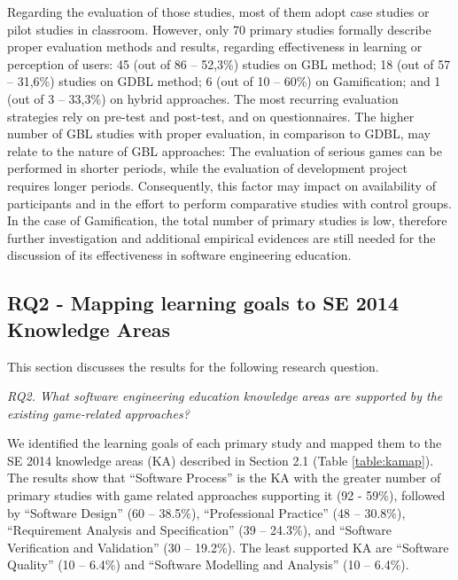 Regarding the evaluation of those studies, most of them adopt case studies or pilot studies in classroom. However, only 70 primary studies formally describe proper evaluation methods and results, regarding effectiveness in learning or perception of users: 45 (out of 86 – 52,3\%) studies on GBL method; 18 (out of 57 – 31,6\%) studies on GDBL method; 6 (out of 10 – 60\%) on Gamification; and 1 (out of 3 – 33,3\%) on hybrid approaches. The most recurring evaluation strategies rely on pre-test and post-test, and on questionnaires. The higher number of GBL studies with proper evaluation, in comparison to GDBL, may relate to the nature of GBL approaches: The evaluation of serious games can be performed in shorter periods, while the evaluation of development project requires longer periods. Consequently, this factor may impact on availability of participants and in the effort to perform comparative studies with control groups. In the case of Gamification, the total number of primary studies is low, therefore further investigation and additional empirical evidences are still needed for the discussion of its effectiveness in software engineering education.

\subsection{RQ2 - Mapping learning goals to SE 2014 Knowledge Areas}
\label{sec:smsrq2}

This section discusses the results for the following research question.

\textit{RQ2. What software engineering education knowledge areas are supported by the existing game-related approaches?}

We identified the learning goals of each primary study and mapped them to the SE 2014 knowledge areas (KA) described in Section 2.1 (Table \ref{table:kamap}). The results show that “Software Process” is the KA with the greater number of primary studies with game related approaches supporting it (92 - 59\%), followed by “Software Design” (60 – 38.5\%), “Professional Practice” (48 – 30.8\%), “Requirement Analysis and Specification” (39 – 24.3\%), and “Software Verification and Validation” (30 – 19.2\%). The least supported KA are “Software Quality” (10 – 6.4\%) and “Software Modelling and Analysis” (10 – 6.4\%).



